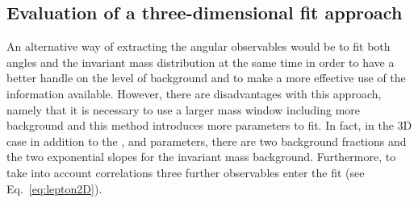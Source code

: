 %
%



\subsection{Evaluation of a three-dimensional fit approach}

An alternative way of extracting the angular observables would be to fit both angles 
and the invariant mass distribution at the same time in order to have a better handle on the level of background and to make 
a more effective use  of the information available. However, there are disadvantages with this approach, namely that
it is necessary to use a larger mass window including more background and this method introduces more parameters to fit.
In fact, in the 3D case in addition to the \afbl, \fl and \afbh parameters, there are
two background fractions and the two exponential slopes for the invariant mass background.
Furthermore, to take into account correlations three further observables enter the fit (see Eq.~\ref{eq:lepton2D}). 

